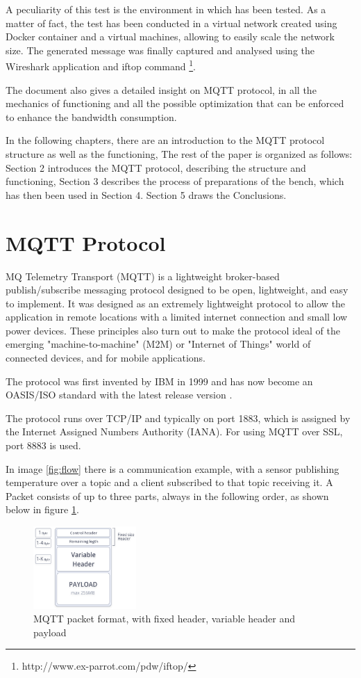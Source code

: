 \documentclass[journal]{IEEEtran}
\begin{document}
A peculiarity of this test is the environment in which has been tested. As a matter of fact, the test has been conducted in a virtual network created using Docker container and a virtual machines, allowing to easily scale the network size. The generated message was finally captured and analysed using the Wireshark application and iftop command \footnote{http://www.ex-parrot.com/pdw/iftop/}. 

The document also gives a detailed insight on MQTT protocol, in all the mechanics of functioning and all the possible optimization that can be enforced to enhance the bandwidth consumption. 

In the following chapters, there are an introduction to the MQTT protocol structure as well as the functioning, 
The rest of the paper is organized as follows: Section 2 introduces the MQTT protocol, 
describing the structure and functioning,
Section 3 describes the process of preparations of the bench, which has then
been used in Section 4. Section 5 draws the Conclusions.

\section{MQTT Protocol}
MQ Telemetry Transport (MQTT) is a lightweight broker-based publish/subscribe messaging protocol designed to be open, lightweight, and easy to implement. It was designed as an extremely lightweight protocol to allow the application in remote locations with a limited internet connection and small low power devices. These principles also turn out to make the protocol ideal of the emerging "machine-to-machine" (M2M) or "Internet of Things" world of connected devices, and for mobile applications. 

The protocol was first invented by IBM in 1999 and has now become an OASIS/ISO standard with the latest release version \cite{mqtt_spec}.

The protocol runs over TCP/IP and typically on port 1883, which is assigned by the Internet Assigned Numbers Authority (IANA). For using MQTT over SSL, port 8883 is used. 

In image \ref{fig:flow} there is a communication example, with a sensor publishing temperature over a topic and a client subscribed to that topic receiving it. 
A Packet consists of up to three parts, always in the following order, as shown below in figure \ref{fig:packet}.

\begin{figure}[h]
	\centering
	\includegraphics[width=0.35\textwidth]{mqtt_2}    
	\caption{MQTT packet format, with fixed header, variable header and payload}
	\label{fig:packet}
\end{figure}
\end{document}
